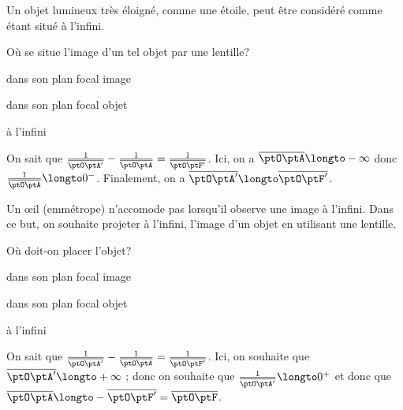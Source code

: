 
\begin{enonce}
Un objet lumineux très éloigné, comme une étoile, peut être considéré comme étant situé à l'infini. 

Où se situe l'image d'un tel objet par une lentille? 

	\begin{listeQCM1Colonne}
	\item dans son plan focal image
	\item dans son plan focal objet
	\item à l'infini
	\end{listeQCM1Colonne}
	
\end{enonce}

\reponse{\reponseA{}}

\begin{corrige}
On sait que $\frac{1}{\overline{\ptO\ptA'}}-\frac{1}{\overline{\ptO\ptA}}=\frac{1}{\overline{\ptO\ptF'}}$. Ici, on a $\overline{\ptO\ptA}\longto-\infty$ donc $\frac{1}{\overline{\ptO\ptA}}\longto 0^-$. Finalement, on a $\overline{\ptO\ptA'}\longto\overline{\ptO\ptF'}$.
\end{corrige}



\bigskip
\begin{enonce}
Un \oe{}il  (emmétrope) n'accomode pas lorsqu'il observe une image à l'infini. Dans ce but, on souhaite projeter à l'infini, l'image d'un objet en utilisant une lentille. 

Où doit-on placer l'objet?

	\begin{listeQCM1Colonne}
	\item dans son plan focal image
	\item dans son plan focal objet
	\item à l'infini
	\end{listeQCM1Colonne}
	
\end{enonce}

\reponse{\reponseB{}}

\begin{corrige}
On sait que $\frac{1}{\overline{\ptO\ptA'}}-\frac{1}{\overline{\ptO\ptA}}=\frac{1}{\overline{\ptO\ptF'}}$. Ici, on souhaite que $\overline{\ptO\ptA'}\longto +\infty$ ; donc on souhaite que $\frac{1}{\overline{\ptO\ptA'}}\longto0^+$ et donc que $\overline{\ptO\ptA}\longto-\overline{\ptO\ptF'}=\overline{\ptO\ptF}$.
\end{corrige}

